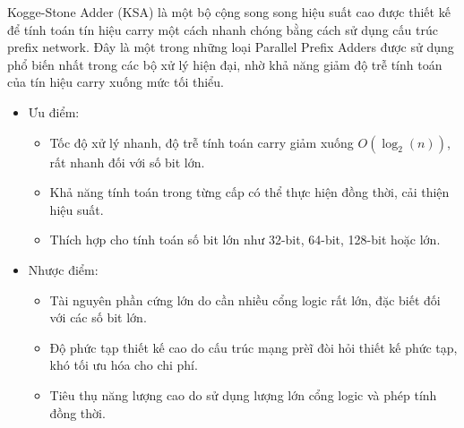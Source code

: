 Kogge-Stone Adder (KSA) là một bộ cộng song song hiệu suất cao được thiết kế để tính toán tín hiệu carry một cách nhanh chóng bằng cách sử dụng cấu trúc prefix network. Đây là một trong những loại Parallel Prefix Adders được sử dụng phổ biến nhất trong các bộ xử lý hiện đại, nhờ khả năng giảm độ trễ tính toán của tín hiệu carry xuống mức tối thiểu.

\begin{itemize}[label = -]
	\item Ưu điểm: 
	\begin{itemize}[label = +]
		\item Tốc độ xử lý nhanh, độ trễ tính toán carry giảm xuống $O(\log_{2}(n))$, rất nhanh đối với số bit lớn.
		\item Khả năng tính toán trong từng cấp có thể thực hiện đồng thời, cải thiện hiệu suất.
		\item Thích hợp cho tính toán số bit lớn như 32-bit, 64-bit, 128-bit hoặc lớn. 
	\end{itemize}
	\item Nhược điểm:
	\begin{itemize}[label = +]
		\item Tài nguyên phần cứng lớn do cần nhiều cổng logic rất lớn, đặc biết đối với các số bit lớn.
		\item Độ phức tạp thiết kế cao do cấu trúc mạng prèĩ đòi hỏi thiết kế phức tạp, khó tối ưu hóa cho chi phí.
		\item Tiêu thụ năng lượng cao do sử dụng lượng lớn cổng logic và phép tính đồng thời.
	\end{itemize}
\end{itemize}